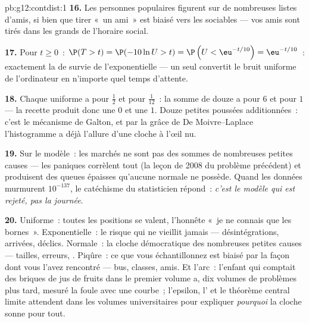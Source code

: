 \begin{solution}{pb:g12:contdist:1}
\textbf{16.} Les personnes populaires figurent sur de nombreuses
listes d'amis, si bien que tirer «~un ami~» est biaisé vers les
sociables --- vos amis sont tirés dans les grands  de
l'horaire social.

\textbf{17.} Pour $t \geq 0$~:
$\P(T > t) = \P(-10\ln U > t) = \P\left(U <
\eu^{-t/10}\right) = \eu^{-t/10}$~: exactement la  de
survie de l'exponentielle --- un seul  convertit le bruit
uniforme de l'ordinateur en n'importe quel temps d'attente.

\textbf{18.} Chaque uniforme a pour  $\frac12$ et pour
 $\frac{1}{12}$~: la somme de douze a pour  $6$ et
pour  $1$ --- la recette produit donc une  $0$ et
une  $1$. Douze petites poussées 
additionnées~: c'est le mécanisme de Galton, et par la grâce de De
Moivre--Laplace l'histogramme a déjà l'allure d'une cloche à
l'œil nu.

\textbf{19.} Sur le modèle~: les marchés ne sont pas des sommes de
nombreuses petites causes \emph{} --- les paniques
corrèlent tout (la leçon de 2008 du problème précédent) et
produisent des queues épaisses qu'aucune  normale ne
possède. Quand les données murmurent $10^{-137}$, le catéchisme du
statisticien répond~: \emph{c'est le modèle qui est rejeté, pas la
journée}.

\textbf{20.} Uniforme~: toutes les positions se valent, l'honnête
«~je ne connais que les bornes~». Exponentielle~: le risque qui ne
vieillit jamais --- désintégrations, arrivées, déclics. Normale~:
la cloche démocratique des nombreuses petites causes 
--- tailles, erreurs, . Piqûre~: ce que vous échantillonnez
est biaisé par la façon dont vous l'avez rencontré --- bus, classes,
amis. Et l'arc~: l'enfant qui comptait des briques de jus de fruits
dans le premier volume a, dix volumes de problèmes plus tard, mesuré
la foule avec une courbe~; l'epsilon, l' et le théorème
central limite attendent dans les volumes universitaires pour
expliquer \emph{pourquoi} la cloche sonne pour tout.
\end{solution}
